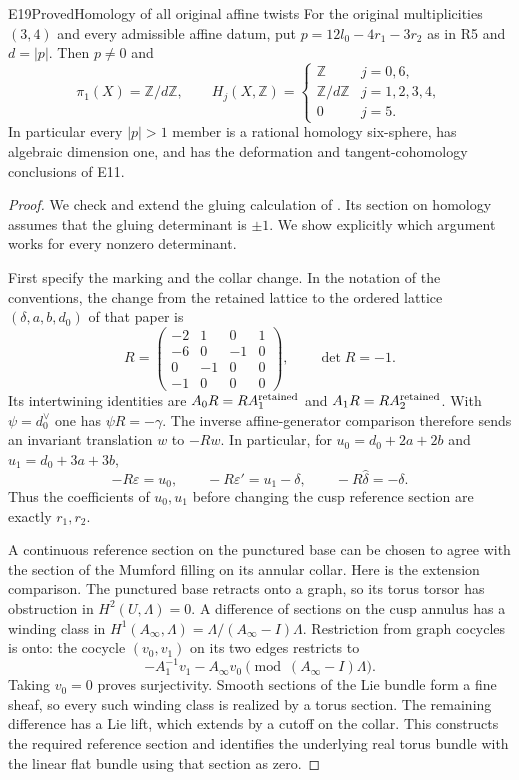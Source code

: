 \begin{statement}{E19}{Proved}{Homology of all original affine twists}
For the original multiplicities $(3,4)$ and every admissible affine
datum, put $p=12l_0-4r_1-3r_2$ as in R5 and $d=|p|$.
Then $p\ne0$ and
\[
 \pi_1(X)=\mathbb Z/d\mathbb Z,
 \qquad
 H_j(X,\mathbb Z)=
 \begin{cases}
  \mathbb Z&j=0,6,\\
  \mathbb Z/d\mathbb Z&j=1,2,3,4,\\
  0&j=5.
 \end{cases}
\]
In particular every $|p|>1$ member is a rational homology
six-sphere, has algebraic dimension one, and has the deformation
and tangent-cohomology conclusions of E11.
\end{statement}
\begin{proof}
We check and extend the gluing calculation of
\cite[Propositions labelled \texttt{mvred}, \texttt{mumford},
and \texttt{matrix}]{Viaclovsky2026Log}. Its section on homology
assumes that the gluing determinant is $\pm1$. We show explicitly
which argument works for every nonzero determinant.

First specify the marking and the collar change. In the notation
of the conventions, the change from the retained lattice to the
ordered lattice $(\delta,a,b,d_0)$ of that paper is
\[
 R=\begin{pmatrix}
 -2&1&0&1\\-6&0&-1&0\\0&-1&0&0\\-1&0&0&0
 \end{pmatrix},\qquad \det R=-1.
\]
Its intertwining identities are $A_0R=RA_1^{\rm retained}$ and
$A_1R=RA_2^{\rm retained}$. With $\psi=d_0^\vee$ one has
$\psi R=-\gamma$. The inverse affine-generator comparison
therefore sends an invariant translation $w$ to $-Rw$.
In particular, for $u_0=d_0+2a+2b$ and
$u_1=d_0+3a+3b$,
\[
 -R\varepsilon=u_0,\qquad
 -R\varepsilon'=u_1-\delta,\qquad
 -R\widehat\delta=-\delta.
\]
Thus the coefficients of $u_0,u_1$ before changing the cusp
reference section are exactly $r_1,r_2$.

A continuous reference section on the punctured base can be
chosen to agree with the section of the Mumford filling on its
annular collar. Here is the extension comparison. The punctured
base retracts onto a graph, so its torus torsor has obstruction
in $H^2(U,\Lambda)=0$. A difference of sections on the cusp
annulus has a winding class in
$H^1(A_\infty,\Lambda)=\Lambda/(A_\infty-I)\Lambda$.
Restriction from graph cocycles is onto: the cocycle
$(v_0,v_1)$ on its two edges restricts to
\[
 -A_1^{-1}v_1-A_\infty v_0
       \pmod{(A_\infty-I)\Lambda}.
\]
Taking $v_0=0$ proves surjectivity. Smooth sections of the Lie
bundle form a fine sheaf, so every such winding class is realized
by a torus section. The remaining difference has a Lie lift,
which extends by a cutoff on the collar. This constructs the
required reference section and identifies the underlying real
torus bundle with the linear flat bundle using that section as
zero.


\end{proof}
